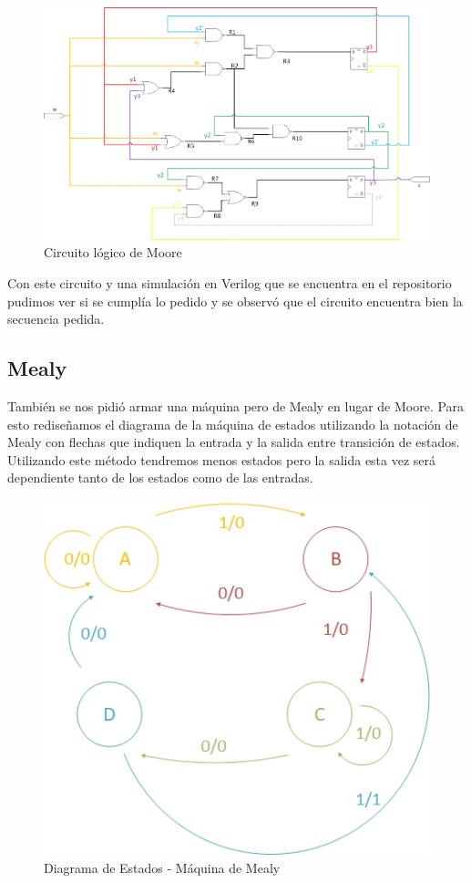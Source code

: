 \begin{figure}[H]
\centering
\includegraphics[width=14cm]{Imagenes/TP2_EJ2_MOORE_GREY.jpg}
\caption{Circuito lógico de Moore}
\end{figure}

Con este circuito y una simulación en Verilog que se encuentra en el repositorio pudimos ver si se cumplía lo pedido y se observó que el circuito encuentra bien la secuencia pedida.

\subsection*{Mealy}

También se nos pidi\'o armar una m\'aquina pero de Mealy en lugar de Moore. Para esto rediseñamos el diagrama de la máquina de estados utilizando la notaci\'on de Mealy con flechas que indiquen la entrada y la salida entre transición de estados. Utilizando este método tendremos menos estados pero la salida esta vez será dependiente tanto de los estados como de las entradas.

\begin{figure}[H]
	\centering
	\includegraphics[scale=0.6]{Imagenes/diagestmealy.jpg}
	\caption{Diagrama de Estados - Máquina de Mealy}
	\label{2_fig7}
\end{figure}

